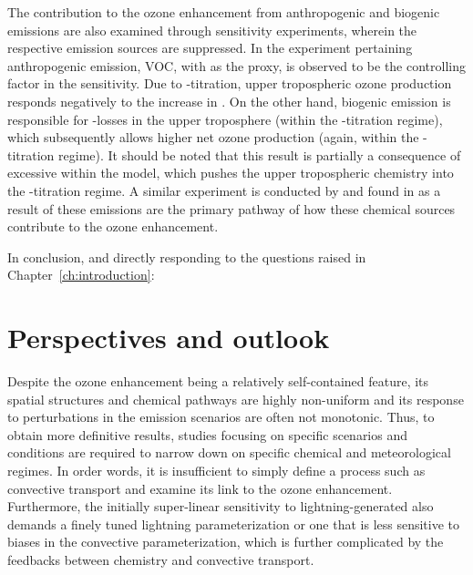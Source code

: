 The contribution to the ozone enhancement from anthropogenic and biogenic emissions are also examined
through sensitivity experiments, wherein the respective emission sources are suppressed. In the
experiment pertaining anthropogenic emission, VOC, with  as the proxy, is observed
to be the controlling factor in the sensitivity. Due to -titration, upper tropospheric
ozone production responds negatively to the increase in . On the other hand, biogenic
emission is responsible for -losses in the upper troposphere (within the
-titration regime), which subsequently allows higher net ozone production (again,
within the -titration regime). It should be noted that this result is partially a consequence
of excessive {\lnox} within the model, which pushes the upper tropospheric chemistry into the -titration
regime. A similar experiment is conducted by \citet{Li:2005ss} and found in  as a result of
these emissions are the primary pathway of how these chemical sources contribute to the ozone enhancement.

In conclusion, and directly responding to the questions raised in Chapter~\ref{ch:introduction}:

\section{Perspectives and outlook}

Despite the ozone enhancement being a relatively self-contained feature, its spatial structures
and chemical pathways are highly non-uniform and its response to perturbations in the emission
scenarios are often not monotonic. Thus, to obtain more definitive results, studies
focusing on specific scenarios and conditions are required to narrow down on specific chemical
and meteorological regimes. In order words, it is insufficient to simply define a process such as
convective transport and examine its link to the ozone enhancement. Furthermore, the initially
super-linear sensitivity to lightning-generated  also demands a finely tuned lightning
parameterization or one that is less sensitive to biases in the convective parameterization, which
is further complicated by the feedbacks between chemistry and convective transport.